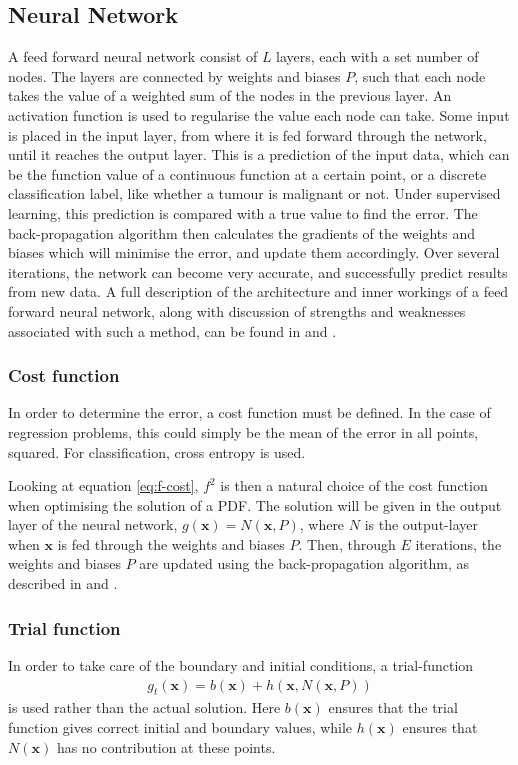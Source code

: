 \documentclass[multicolumn, 9pt]{extarticle}
\begin{document}
\subsection{Neural Network}
A feed forward neural network consist of $L$ layers, each with a set number of nodes. The layers are connected by weights and biases $P$, such that each node takes the value of a weighted sum of the nodes in the previous layer. An activation function is used to regularise the value each node can take. Some input is placed in the input layer, from where it is fed forward through the network, until it reaches the output layer. This is a prediction of the input data, which can be the function value of a continuous function at a certain point, or a discrete classification label, like whether a tumour is malignant or not. Under supervised learning, this prediction is compared with a true value to find the error. The back-propagation algorithm then calculates the gradients of the weights and biases which will minimise the error, and update them accordingly. Over several iterations, the network can become very accurate, and successfully predict results from new data. A full description of the architecture and inner workings of a feed forward neural network, along with discussion of strengths and weaknesses associated with such a method, can be found in \cite{p2S} and \cite{p2HO}.

\subsubsection{Cost function}
In order to determine the error, a cost function must be defined. In the case of regression problems, this could simply be the mean of the error in all points, squared. For classification, cross entropy is used. 

Looking at equation \eqref{eq:f-cost}, $f^2$ is then a natural choice of the cost function when optimising the solution of a PDF. The solution will be given in the output layer of the neural network, $g(\mathbf{x}) = N(\mathbf{x}, P)$, where $N$ is the output-layer when $\mathbf{x}$ is fed through the weights and biases $P$.
Then, through $E$ iterations, the weights and biases $P$ are updated using the back-propagation algorithm, as described in \cite{p2S} and \cite{p2HO}.

\subsubsection{Trial function}\label{sec:trialf}
In order to take care of the boundary and initial conditions, a trial-function
\begin{align*}
	g_t(\mathbf{x}) = b(\mathbf{x}) + h(\mathbf{x}, N(\mathbf{x}, P))
\end{align*}
is used rather than the actual solution. Here $b(\mathbf{x})$ ensures that the trial function gives correct initial and boundary values, while $h(\mathbf{x})$ ensures that $N(\mathbf{x})$ has no contribution at these points.
\end{document}
